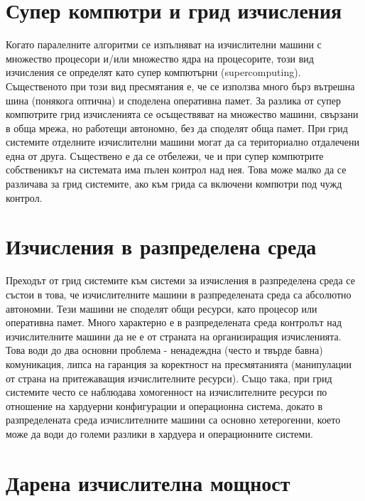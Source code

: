\documentclass[book,14pt,oneside,openany]{memoir}
\begin{document}
\section{Супер компютри и грид изчисления}

Когато паралелните алгоритми се изпълняват на изчислителни машини с множество процесори и/или множество ядра на процесорите, този вид изчисления се определят като супер компютърни (supercomputing). Същественото при този вид пресмятания е, че се използва много бърз вътрешна шина (понякога оптична) и споделена оперативна памет. За разлика от супер компютрите грид изчисленията се осъществяват на множество машини, свързани в обща мрежа, но работещи автономно, без да споделят обща памет. При грид системите отделните изчислителни машини могат да са териториално отдалечени една от друга. Съществено е да се отбележи, че и при супер компютрите собственикът на системата има пълен контрол над нея. Това може малко да се различава за грид системите, ако към грида са включени компютри под чужд контрол. 

\section{Изчисления в разпределена среда}

Преходът от грид системите към системи за изчисления в разпределена среда се състои в това, че изчислителните машини в разпределената среда са абсолютно автономни. Тези машини не споделят общи ресурси, като процесор или оперативна памет. Много характерно е в разпределената среда контролът над изчислителните машини да не е от страната на организиращия изчисленията. Това води до два основни проблема - ненадеждна (често и твърде бавна) комуникация, липса на гаранция за коректност на пресмятанията (манипулации от страна на притежаващия изчислителните ресурси). Също така, при грид системите често се наблюдава хомогенност на изчислителните ресурси по отношение на хардуерни конфигурации и операционна система, докато в разпределената среда изчислителните машини са основно хетерогенни, което може да води до големи разлики в хардуера и операционните системи. 

\section{Дарена изчислителна мощност}
\end{document}
